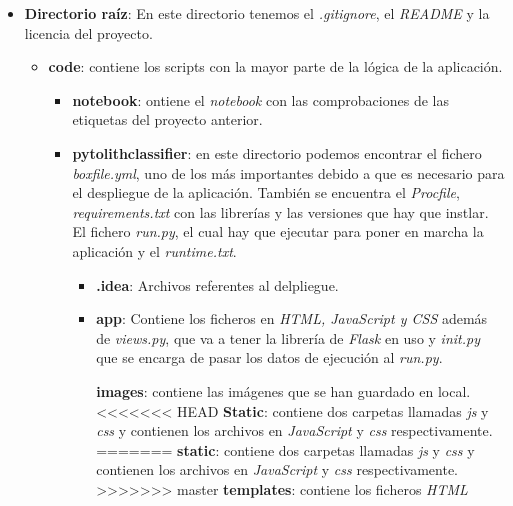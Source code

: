 \begin{itemize}
	\item \textbf{Directorio raíz}: En este directorio tenemos el \textit{.gitignore}, el \textit{README} y la licencia del proyecto.
	\begin{itemize}
		\item \textbf{code}: contiene los scripts con la mayor parte de la lógica de la aplicación.
			\begin{itemize}
				\item \textbf{notebook}: ontiene el \textit{notebook} con las comprobaciones de las etiquetas del proyecto anterior.
				\item \textbf{pytolithclassifier}: en este directorio podemos encontrar el fichero \textit{boxfile.yml}, uno de los más importantes debido a que es necesario para el despliegue de la aplicación. También se encuentra el \textit{Procfile}, \textit{requirements.txt} con las librerías y las versiones que hay que instlar. El fichero \textit{run.py}, el cual hay que ejecutar para poner en marcha la aplicación y el \textit{runtime.txt}.
				\begin{itemize}
					\item \textbf{.idea}: Archivos referentes al delpliegue.
					\item \textbf{app}: Contiene los ficheros en \textit{HTML, JavaScript y CSS} además de \textit{views.py}, que va a tener la librería de \textit{Flask} en uso y \textit{init.py} que se encarga de pasar los datos de ejecución al \textit{run.py}.
					
						\subitem \textbf{images}: contiene las imágenes que se han guardado en local.
<<<<<<< HEAD
						\subitem \textbf{Static}: contiene dos carpetas llamadas \textit{js} y \textit{ css} y contienen los archivos en \textit{JavaScript} y \textit{css} respectivamente.
=======
						\subitem \textbf{static}: contiene dos carpetas llamadas \textit{js} y \textit{ css} y contienen los archivos en \textit{JavaScript} y \textit{css} respectivamente.
>>>>>>> master
						\subitem \textbf{templates}: contiene los ficheros \textit{HTML} 
					

\end{itemize}
\end{itemize}
\end{itemize}
\end{itemize}
